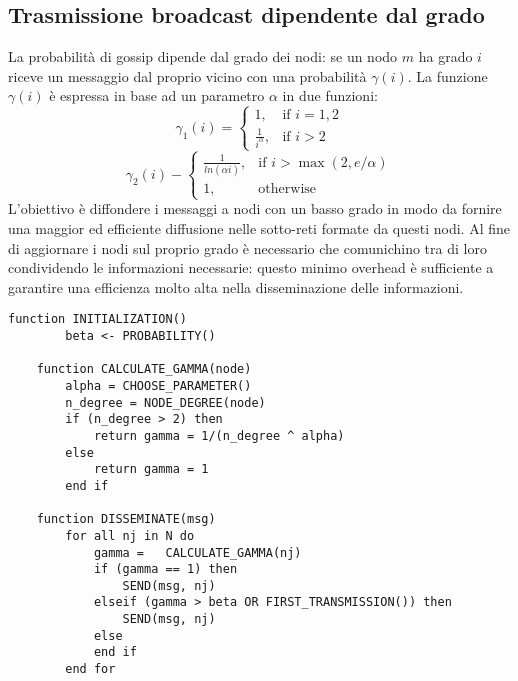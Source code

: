 \begin{appendices}
    \section{Trasmissione broadcast dipendente dal grado}
    La probabilità di gossip dipende dal grado dei nodi: se un nodo $m$ ha grado $i$ riceve un messaggio dal proprio vicino con una probabilità $\gamma(i)$. La funzione $\gamma(i)$ è espressa in base ad un parametro $\alpha$ in due funzioni:
    \begin{equation}
        \gamma_1(i) = \begin{cases} 1, & \mbox{if } i=1,2 \\ \frac{1}{i^{\alpha}}, & \mbox{if } i\gt2\end{cases}
    \end{equation}
    \begin{equation}
        \gamma_2(i) - \begin{cases} \frac{1}{ln(\alpha i)}, & \mbox{if } i\gt \max(2, e/\alpha) \\ 1, & \mbox{otherwise}\end{cases}
    \end{equation}
    L'obiettivo è diffondere i messaggi a nodi con un basso grado in modo da fornire una maggior ed efficiente diffusione nelle sotto-reti formate da questi nodi. Al fine di aggiornare i nodi sul proprio grado è necessario che comunichino tra di loro condividendo le informazioni necessarie: questo minimo overhead è sufficiente a garantire una efficienza molto alta nella disseminazione delle informazioni.
    \begin{lstlisting}[caption=Pseudocodice dell'algoritmo di diffusione con a broadcast dipendente dal grado]
    function INITIALIZATION()
        beta <- PROBABILITY()
    
    function CALCULATE_GAMMA(node)
        alpha = CHOOSE_PARAMETER()
        n_degree = NODE_DEGREE(node)
        if (n_degree > 2) then
            return gamma = 1/(n_degree ^ alpha)
        else
            return gamma = 1
        end if
    
    function DISSEMINATE(msg)
        for all nj in N do
            gamma =   CALCULATE_GAMMA(nj)
            if (gamma == 1) then
                SEND(msg, nj)
            elseif (gamma > beta OR FIRST_TRANSMISSION()) then           
                SEND(msg, nj)
            else
            end if
        end for
    \end{lstlisting}
\end{appendices}

